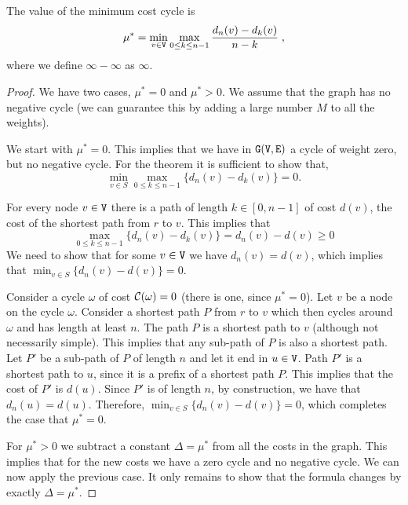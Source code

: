 \begin{theorem}
The value of the minimum cost cycle is
\[
\mu^*=\min_{v\in {\tt V}} \max_{0\leq k \leq n-1}
\frac{d_n(v)-d_{k}(v)}{n-k}\;,
\]
where we define $\infty-\infty$ as $\infty$.
\end{theorem}

\begin{proof}
We have two cases, $\mu^*=0$ and $\mu^*>0$. We assume that the graph
has no negative cycle (we can guarantee this by adding a large
number $M$ to all the weights).

We start with $\mu^*=0$. This implies that we have in ${\tt G}({\tt V},{\tt E})$ a
cycle of weight zero, but no negative cycle. For the theorem it is
sufficient to show that,
\[
\min_{v\in S} \max_{0\leq k \leq n-1} \{d_n(v)-d_{k}(v)\}=0.
\]

For every node $v\in {\tt V}$ there is a path of length $k\in[0,n-1]$ of
cost $d(v)$, the cost of the shortest path from $r$ to $v$. This
implies that
\[
\max_{0\leq k \leq n-1} \{d_n(v)-d_{k}(v)\}=d_n(v)-d(v)\geq 0
\]
We need to show that for some $v\in {\tt V}$ we have $d_n(v)=d(v)$, which
implies that $\min_{v\in S} \{d_n(v)-d(v)\}=0$.

Consider a cycle $\omega$ of cost $\mathcal{C}(\omega)=0$ (there is one,
since $\mu^*=0$). Let $v$ be a node on the cycle $\omega$. Consider
a shortest path $P$ from $r$ to $v$ which then cycles around $\omega$ and has
length at least $n$. The path $P$ is a shortest path to $v$
(although not necessarily simple). This implies that any sub-path of
$P$ is also a shortest path. Let $P'$ be a sub-path of $P$ of length
$n$ and let it end in $u\in {\tt V}$.
%
Path $P'$ is a shortest path to $u$, since it is a prefix of a
shortest path $P$.
%
This implies that the cost of $P'$ is $d(u)$. Since $P'$ is of
length $n$, by construction, we have that $d_n(u)=d(u)$. Therefore,
$\min_{v\in S} \{d_n(v)-d(v)\}=0$, which completes the case that
$\mu^*=0$.

For $\mu^*>0$ we subtract a constant $\Delta=\mu^*$ from all the
costs in the graph. This implies that for the new costs we have a
zero cycle and no negative cycle. We can now apply the previous
case. It only remains to show that the formula changes by exactly
$\Delta=\mu^*$.


\end{proof}

